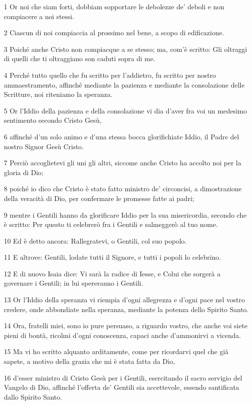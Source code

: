 \par 1 Or noi che siam forti, dobbiam sopportare le debolezze de' deboli e non compiacere a noi stessi.
\par 2 Ciascun di noi compiaccia al prossimo nel bene, a scopo di edificazione.
\par 3 Poiché anche Cristo non compiacque a se stesso; ma, com'è scritto: Gli oltraggi di quelli che ti oltraggiano son caduti sopra di me.
\par 4 Perché tutto quello che fu scritto per l'addietro, fu scritto per nostro ammaestramento, affinché mediante la pazienza e mediante la consolazione delle Scritture, noi riteniamo la speranza.
\par 5 Or l'Iddio della pazienza e della consolazione vi dia d'aver fra voi un medesimo sentimento secondo Cristo Gesù,
\par 6 affinché d'un solo animo e d'una stessa bocca glorifichiate Iddio, il Padre del nostro Signor Gesù Cristo.
\par 7 Perciò accoglietevi gli uni gli altri, siccome anche Cristo ha accolto noi per la gloria di Dio;
\par 8 poiché io dico che Cristo è stato fatto ministro de' circoncisi, a dimostrazione della veracità di Dio, per confermare le promesse fatte ai padri;
\par 9 mentre i Gentili hanno da glorificare Iddio per la sua misericordia, secondo che è scritto: Per questo ti celebrerò fra i Gentili e salmeggerò al tuo nome.
\par 10 Ed è detto ancora: Rallegratevi, o Gentili, col suo popolo.
\par 11 E altrove: Gentili, lodate tutti il Signore, e tutti i popoli lo celebrino.
\par 12 E di nuovo Isaia dice: Vi sarà la radice di Iesse, e Colui che sorgerà a governare i Gentili; in lui spereranno i Gentili.
\par 13 Or l'Iddio della speranza vi riempia d'ogni allegrezza e d'ogni pace nel vostro credere, onde abbondiate nella speranza, mediante la potenza dello Spirito Santo.
\par 14 Ora, fratelli miei, sono io pure persuaso, a riguardo vostro, che anche voi siete pieni di bontà, ricolmi d'ogni conoscenza, capaci anche d'ammonirvi a vicenda.
\par 15 Ma vi ho scritto alquanto arditamente, come per ricordarvi quel che già sapete, a motivo della grazia che mi è stata fatta da Dio,
\par 16 d'esser ministro di Cristo Gesù per i Gentili, esercitando il sacro servigio del Vangelo di Dio, affinché l'offerta de' Gentili sia accettevole, essendo santificata dallo Spirito Santo.
